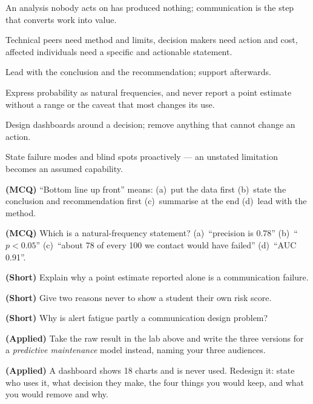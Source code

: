 \begin{chaptersummary}
\begin{tight}
  \item An analysis nobody acts on has produced nothing; communication is the step
        that converts work into value.
  \item Technical peers need method and limits, decision makers need action and
        cost, affected individuals need a specific and actionable statement.
  \item Lead with the conclusion and the recommendation; support afterwards.
  \item Express probability as natural frequencies, and never report a point
        estimate without a range or the caveat that most changes its use.
  \item Design dashboards around a decision; remove anything that cannot change an
        action.
  \item State failure modes and blind spots proactively --- an unstated limitation
        becomes an assumed capability.
\end{tight}
\end{chaptersummary}

\begin{reviewq}
  \item \textbf{(MCQ)} ``Bottom line up front'' means: (a)~put the data first
        (b)~state the conclusion and recommendation first (c)~summarise at the end
        (d)~lead with the method.
  \item \textbf{(MCQ)} Which is a natural-frequency statement? (a)~``precision is
        0.78'' (b)~``$p<0.05$'' (c)~``about 78 of every 100 we contact would have
        failed'' (d)~``AUC 0.91''.
  \item \textbf{(Short)} Explain why a point estimate reported alone is a
        communication failure.
  \item \textbf{(Short)} Give two reasons never to show a student their own risk
        score.
  \item \textbf{(Short)} Why is alert fatigue partly a communication design problem?
  \item \textbf{(Applied)} Take the raw result in the lab above and write the three
        versions for a \emph{predictive maintenance} model instead, naming your three
        audiences.
  \item \textbf{(Applied)} A dashboard shows 18 charts and is never used. Redesign it:
        state who uses it, what decision they make, the four things you would keep,
        and what you would remove and why.
\end{reviewq}
